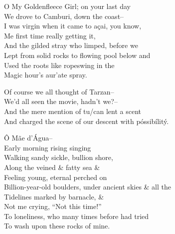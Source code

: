 O My Goldenfleece Girl; on your last day \\
We drove to Camburi, down the coast-- \\
I was virgin when it came to açai, you know, \\
Me first time really getting it, \\
And the gilded stray who limped, before we \\ 
Lept from solid rocks to flowing pool below and \\
Used the roots like ropeswing in the \\
Magic hour's aur'ate spray.

Of course we all thought of Tarzan-- \\
We'd all seen the movie, hadn't we?-- \\
And the mere mention of tu/can lent a scent \\ %
And charged the scene of our descent with póssibílitý.

Ô Mãe d'Água-- \\
Early morning rising singing \\
Walking sandy sickle, bullion shore, \\
Along the veined \& fatty sea \& \\
Feeling young, eternal perched on \\ 
Billion-year-old boulders, under ancient skies \& all the \\
Tidelines marked by barnacle, \& \\
Not me crying, ``Not this time!'' \\
To loneliness, who many times before had tried \\
To wash upon these rocks of mine.